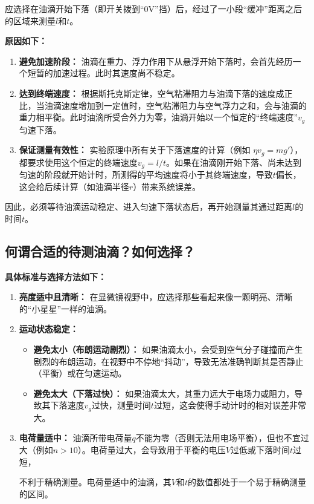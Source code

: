\documentclass[yuxi]{../template/Report}%
\begin{document}
\begin{fullreportonly}
应选择在油滴开始下落（即开关拨到“0V”挡）后，经过了一小段“缓冲”距离之后的区域来测量$l$和$t$。

\textbf{原因如下：}
\begin{enumerate}
    \item \textbf{避免加速阶段：} 油滴在重力、浮力作用下从悬浮开始下落时，会首先经历一个短暂的加速过程。此时其速度尚不稳定。
    \item \textbf{达到终端速度：} 根据斯托克斯定律，空气粘滞阻力与油滴下落的速度成正比，当油滴速度增加到一定值时，空气粘滞阻力与空气浮力之和，会与油滴的重力相平衡。此时油滴所受合外力为零，油滴开始以一个恒定的“终端速度”$v_g$匀速下落。
    \item \textbf{保证测量有效性：} 实验原理中所有关于下落速度的计算（例如 $\eta v_g = mg' $），都要求使用这个恒定的终端速度$v_g = l/t$。如果在油滴刚开始下落、尚未达到匀速的阶段就开始计时，所测得的平均速度将小于其终端速度，导致$t$偏长，这会给后续计算（如油滴半径$r$）带来系统误差。
\end{enumerate}

因此，必须等待油滴运动稳定、进入匀速下落状态后，再开始测量其通过距离$l$的时间$t$。


\subsection{何谓合适的待测油滴？如何选择？}

\textbf{具体标准与选择方法如下：}
\begin{enumerate}
    \item \textbf{亮度适中且清晰：} 在显微镜视野中，应选择那些看起来像一颗明亮、清晰的“小星星”一样的油滴。
    \item \textbf{运动状态稳定：}
        \begin{itemize}
            \item \textbf{避免太小（布朗运动剧烈）：} 如果油滴太小，会受到空气分子碰撞而产生剧烈的布朗运动，在视野中不停地“抖动”，导致无法准确判断其是否静止（平衡）或在匀速运动。
            \item \textbf{避免太大（下落过快）：} 如果油滴太大，其重力远大于电场力或阻力，导致其下落速度$v_g$过快，测量时间$t$过短，这会使得手动计时的相对误差非常大。
        \end{itemize}
    \item \textbf{电荷量适中：} 油滴所带电荷量$q$不能为零（否则无法用电场平衡），但也不宜过大（例如$n>10$）。电荷量过大，会导致用于平衡的电压$V$过低或下落时间$t$过短，

    不利于精确测量。电荷量适中的油滴，其$V$和$t$的数值都处于一个易于精确测量的区间。


\end{enumerate}
\end{fullreportonly}
\end{document}
